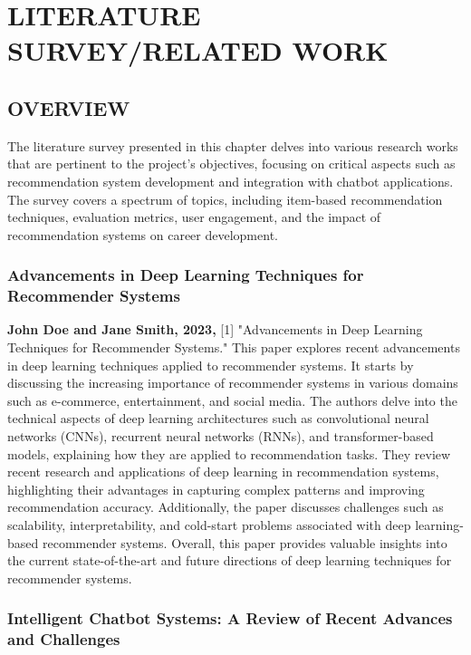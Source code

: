 
\chapter{\uppercase{Literature Survey/Related Work}} %
\label{ch:survey} %
\section{\uppercase{Overview}}

The literature survey presented in this chapter delves into various research works that are pertinent to the project's objectives, focusing on critical aspects such as recommendation system development and integration with chatbot applications. The survey covers a spectrum of topics, including item-based recommendation techniques, evaluation metrics, user engagement, and the impact of recommendation systems on career development.

\subsection{Advancements in Deep Learning Techniques for Recommender Systems}

\textbf{John Doe and Jane Smith, 2023,} [1] "Advancements in Deep Learning Techniques for Recommender Systems." This paper explores recent advancements in deep learning techniques applied to recommender systems. It starts by discussing the increasing importance of recommender systems in various domains such as e-commerce, entertainment, and social media. The authors delve into the technical aspects of deep learning architectures such as convolutional neural networks (CNNs), recurrent neural networks (RNNs), and transformer-based models, explaining how they are applied to recommendation tasks. They review recent research and applications of deep learning in recommendation systems, highlighting their advantages in capturing complex patterns and improving recommendation accuracy. Additionally, the paper discusses challenges such as scalability, interpretability, and cold-start problems associated with deep learning-based recommender systems. Overall, this paper provides valuable insights into the current state-of-the-art and future directions of deep learning techniques for recommender systems.

\subsection{Intelligent Chatbot Systems: A Review of Recent Advances and Challenges}


